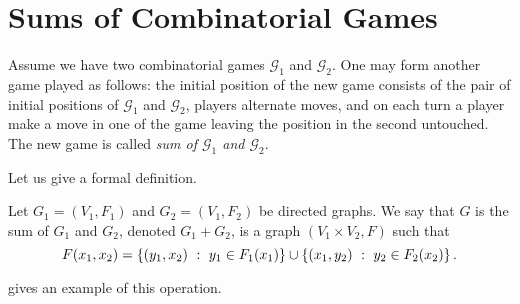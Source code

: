 \chapter{Sums of Combinatorial Games}
Assume we have two combinatorial games $\mathcal{G}_1$ and $\mathcal{G}_2$.
One may form another game played as follows: the initial position of the new game
consists of the pair of initial positions of $\mathcal{G}_1$ and $\mathcal{G}_2$,
players alternate moves, and on each turn a player make a move in one of the game
leaving the position in the second untouched.  The new game is called
\emph{sum of $\mathcal{G}_1$ and $\mathcal{G}_2$}.

Let us give a formal definition.
\begin{definition}
    Let $G_1 = (V_1, F_1)$ and $G_2 = (V_1, F_2)$ be directed graphs.
    We say that $G$ is the sum of $G_1$ and $G_2$, denoted $G_1 + G_2$, is
    a graph $(V_1 \times V_2, F)$  such that
    \[
        F(x_1, x_2) =
            \set[y_1 \in F_1(x_1)]{(y_1, x_2)} \cup
            \set[y_2 \in F_2(x_2)]{(x_1, y_2)}.
    \]
\end{definition}
 gives an example of this operation.

